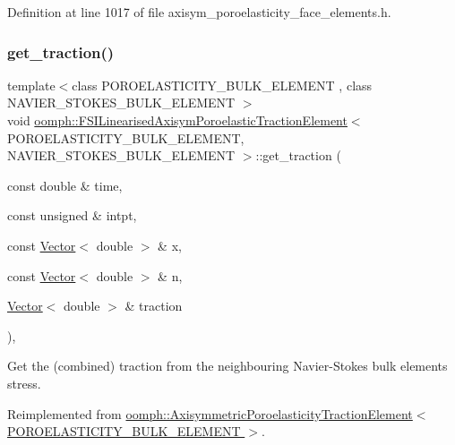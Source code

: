 Definition at line 1017 of file axisym\+\_\+poroelasticity\+\_\+face\+\_\+elements.\+h.

\mbox{\label{classoomph_1_1FSILinearisedAxisymPoroelasticTractionElement_ace2d9e5b5f0fbea991a95b5e1c0f7b80}} 
\subsubsection{\texorpdfstring{get\+\_\+traction()}{get\_traction()}}
{\footnotesize\ttfamily template$<$class P\+O\+R\+O\+E\+L\+A\+S\+T\+I\+C\+I\+T\+Y\+\_\+\+B\+U\+L\+K\+\_\+\+E\+L\+E\+M\+E\+NT , class N\+A\+V\+I\+E\+R\+\_\+\+S\+T\+O\+K\+E\+S\+\_\+\+B\+U\+L\+K\+\_\+\+E\+L\+E\+M\+E\+NT $>$ \\
void \hyperlink{classoomph_1_1FSILinearisedAxisymPoroelasticTractionElement}{oomph\+::\+F\+S\+I\+Linearised\+Axisym\+Poroelastic\+Traction\+Element}$<$ P\+O\+R\+O\+E\+L\+A\+S\+T\+I\+C\+I\+T\+Y\+\_\+\+B\+U\+L\+K\+\_\+\+E\+L\+E\+M\+E\+NT, N\+A\+V\+I\+E\+R\+\_\+\+S\+T\+O\+K\+E\+S\+\_\+\+B\+U\+L\+K\+\_\+\+E\+L\+E\+M\+E\+NT $>$\+::get\+\_\+traction (\begin{DoxyParamCaption}\item[{const double \&}]{time,  }\item[{const unsigned \&}]{intpt,  }\item[{const \hyperlink{classoomph_1_1Vector}{Vector}$<$ double $>$ \&}]{x,  }\item[{const \hyperlink{classoomph_1_1Vector}{Vector}$<$ double $>$ \&}]{n,  }\item[{\hyperlink{classoomph_1_1Vector}{Vector}$<$ double $>$ \&}]{traction }\end{DoxyParamCaption})\hspace{0.3cm}{\ttfamily [inline]}, {\ttfamily [virtual]}}



Get the (combined) traction from the neighbouring Navier-\/\+Stokes bulk element\textquotesingle{}s stress. 



Reimplemented from \hyperlink{classoomph_1_1AxisymmetricPoroelasticityTractionElement_a0d996e2947fe74e991d1f382cfa5491d}{oomph\+::\+Axisymmetric\+Poroelasticity\+Traction\+Element$<$ P\+O\+R\+O\+E\+L\+A\+S\+T\+I\+C\+I\+T\+Y\+\_\+\+B\+U\+L\+K\+\_\+\+E\+L\+E\+M\+E\+N\+T $>$}.



